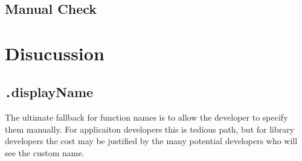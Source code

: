\documentclass[10pt, preprint]{sigplanconf}
\begin{document}
{\begin{table}
\centering
{}
 \label{firebug} 
\caption{Number of similar, and different function names in comparison to Firebug {\small \texttt{guessFunctionName()}}.}
\end{table}    

\subsection{Manual Check}



\section{Disucussion}

\subsection{ {\texttt .displayName} }
The ultimate fallback for function names is to allow the developer to specify them manually. For applicaiton developers this is tedious path, but for library developers the cost may be justified by the many potential developers who will see the custom name.

}
\end{document}
